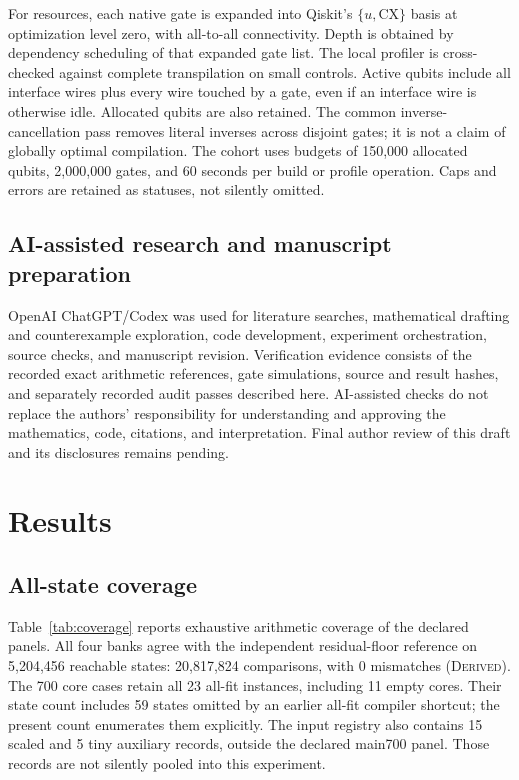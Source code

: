 \documentclass[referee,pdflatex,sn-mathphys-num]{sn-jnl}
\theoremstyle{thmstyleone}
\theoremstyle{thmstyletwo}
\begin{document}
For resources, each native gate is expanded into Qiskit's $\{u,\mathrm{CX}\}$ basis at optimization level zero, with all-to-all connectivity. Depth is obtained by dependency scheduling of that expanded gate list. The local profiler is cross-checked against complete transpilation on small controls. Active qubits include all interface wires plus every wire touched by a gate, even if an interface wire is otherwise idle. Allocated qubits are also retained. The common inverse-cancellation pass removes literal inverses across disjoint gates; it is not a claim of globally optimal compilation. The cohort uses budgets of 150,000 allocated qubits, 2,000,000 gates, and 60 seconds per build or profile operation. Caps and errors are retained as statuses, not silently omitted.

\subsection{AI-assisted research and manuscript preparation}
OpenAI ChatGPT/Codex was used for literature searches, mathematical drafting and counterexample exploration, code development, experiment orchestration, source checks, and manuscript revision. Verification evidence consists of the recorded exact arithmetic references, gate simulations, source and result hashes, and separately recorded audit passes described here. AI-assisted checks do not replace the authors' responsibility for understanding and approving the mathematics, code, citations, and interpretation. Final author review of this draft and its disclosures remains pending.

\section{Results}\label{sec:results}
\subsection{All-state coverage}
Table~\ref{tab:coverage} reports exhaustive arithmetic coverage of the declared panels. All four banks agree with the independent residual-floor reference on 5,204,456 reachable states: 20,817,824 comparisons, with 0 mismatches (\textsc{Derived}). The 700 core cases retain all 23 all-fit instances, including 11 empty cores. Their state count includes 59 states omitted by an earlier all-fit compiler shortcut; the present count enumerates them explicitly. The input registry also contains 15 scaled and 5 tiny auxiliary records, outside the declared main700 panel. Those records are not silently pooled into this experiment.
\end{document}
